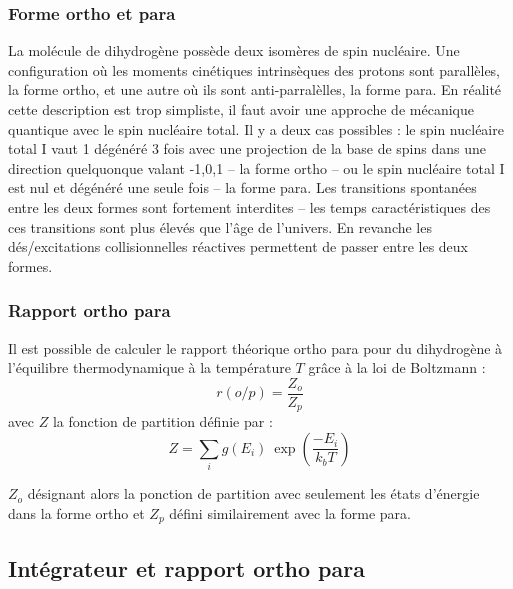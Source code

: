 \documentclass[10pt, a4paper]{report}
\numberwithin{equation}{subsection}
\begin{document}
\subsubsection{Forme ortho et para}
La molécule de dihydrogène possède deux isomères de spin nucléaire. Une configuration où les moments cinétiques intrinsèques des protons sont parallèles, la forme ortho, et une autre où ils sont anti-parralèlles, la forme para. En réalité cette description est trop simpliste, il faut avoir une approche de mécanique quantique avec le spin nucléaire total. Il y a deux cas possibles : le spin nucléaire total I vaut 1 dégénéré 3 fois avec une projection de la base de spins dans une direction quelquonque valant {-1,0,1} -- la forme ortho -- ou le spin nucléaire total I est nul et dégénéré une seule fois -- la forme para. Les transitions spontanées entre les deux formes sont fortement interdites -- les temps caractéristiques des ces transitions sont plus élevés que l'âge de l'univers. En revanche les dés/excitations collisionnelles réactives permettent de passer entre les deux formes. 
\subsubsection{Rapport ortho para}
Il est possible de calculer le rapport théorique ortho para pour du dihydrogène à l'équilibre thermodynamique à la température $T$ grâce à la loi de Boltzmann :
\begin{equation} \label{eq:EROP}
\boxed{r(o/p) = \frac{Z_o}{Z_p}}
\end{equation}
avec $Z$ la fonction de partition définie par :
\begin{equation} \label{eq:EZ}
 \boxed{Z = \sum\limits_i g(E_i) \ \exp\left(\frac{-E_i}{k_bT}\right)}
\end{equation}
 
$Z_o$ désignant alors la ponction de partition avec seulement les états d'énergie dans la forme ortho et $Z_p$ défini similairement avec la forme para.


\subsection{Intégrateur et rapport ortho para}
\end{document}
